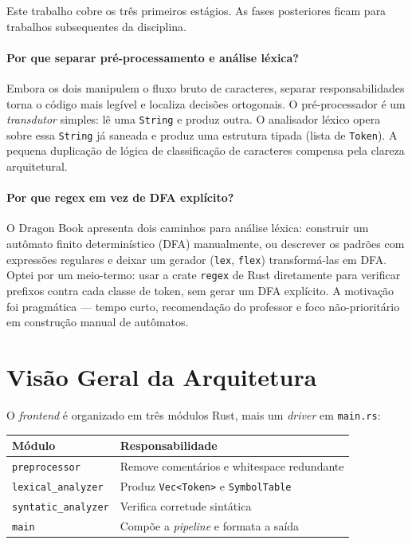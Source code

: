 \documentclass[12pt,a4paper]{article}
\begin{document}
Este trabalho cobre os três primeiros estágios. As fases posteriores ficam
para trabalhos subsequentes da disciplina.

\paragraph{Por que separar pré-processamento e análise léxica?}
Embora os dois manipulem o fluxo bruto de caracteres, separar
responsabilidades torna o código mais legível e localiza decisões
ortogonais. O pré-processador é um \emph{transdutor} simples: lê uma
\texttt{String} e produz outra. O analisador léxico opera sobre essa
\texttt{String} já saneada e produz uma estrutura tipada (lista de
\texttt{Token}). A pequena duplicação de lógica de classificação de
caracteres compensa pela clareza arquitetural.

\paragraph{Por que regex em vez de DFA explícito?}
O Dragon Book apresenta dois caminhos para análise léxica: construir um
autômato finito determinístico (DFA) manualmente, ou descrever os padrões
com expressões regulares e deixar um gerador (\texttt{lex}, \texttt{flex})
transformá-las em DFA. Optei por um meio-termo: usar a crate
\texttt{regex} de Rust diretamente para verificar prefixos contra cada
classe de token, sem gerar um DFA explícito. A motivação foi
pragmática --- tempo curto, recomendação do professor e foco
não-prioritário em construção manual de autômatos.

\section{Visão Geral da Arquitetura}

O \emph{frontend} é organizado em três módulos Rust, mais um \emph{driver}
em \texttt{main.rs}:

\begin{center}
\begin{tabular}{l|l}
\textbf{Módulo} & \textbf{Responsabilidade} \\ \hline
\texttt{preprocessor} & Remove comentários e whitespace redundante \\
\texttt{lexical\_analyzer} & Produz \texttt{Vec<Token>} e \texttt{SymbolTable} \\
\texttt{syntatic\_analyzer} & Verifica corretude sintática \\
\texttt{main} & Compõe a \emph{pipeline} e formata a saída \\
\end{tabular}
\end{center}
\end{document}
